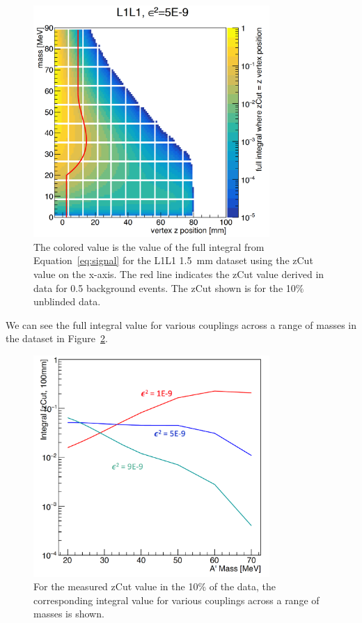 \documentclass[twoside]{article}
\begin{document}
\begin{figure}[H]
  \centering
     \includegraphics[width=0.8\textwidth]{plots/L1L1_eff1p5_zm.png}
  \caption{The colored value is the value of the full integral from Equation~\ref{eq:signal} for the L1L1 1.5~mm dataset using the zCut value on the x-axis. The red line indicates the zCut value derived in data for 0.5 background events. The zCut shown is for the 10$\%$ unblinded data.}
  \label{fig:Inteff_L1L1_1p5}
\end{figure} 

 We can see the full integral value for various couplings across a range of masses in the dataset in Figure~\ref{fig:IntCoup_L1l1}.

\begin{figure}[H]
  \centering
     \includegraphics[width=0.8\textwidth]{plots/integratedEff_1p5.png}
  \caption{For the measured zCut value in the 10$\%$ of the data, the corresponding integral value for various couplings across a range of masses is shown.}
  \label{fig:IntCoup_L1l1}
\end{figure} 
\end{document}
